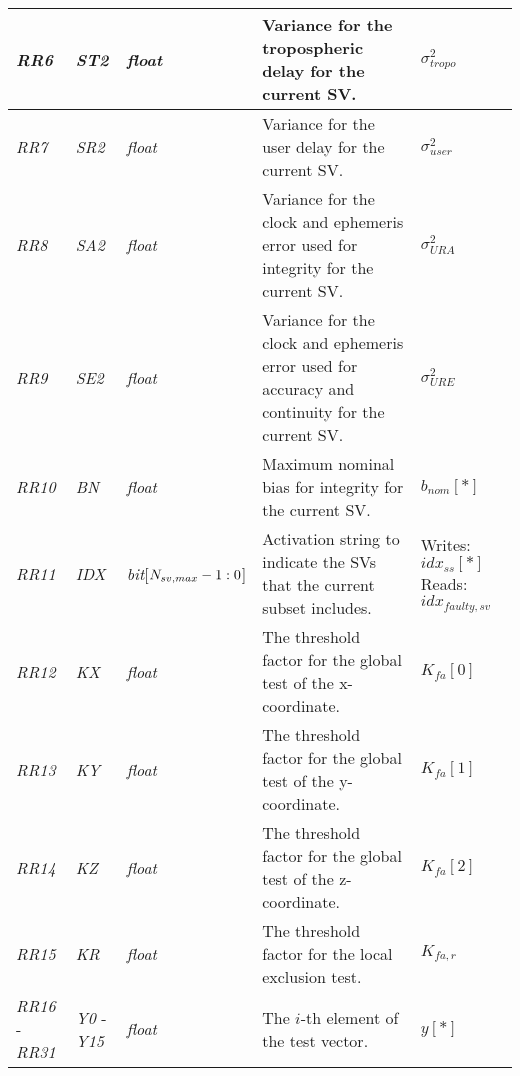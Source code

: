 \documentclass[11pt]{article}
\begin{document}
\begin{table}[htbp]
\begin{center}
\begin{tabular}{|m{1.25cm}|m{1.5cm}|m{1.75cm}|m{5.25cm}|m{1.5cm}|}
    \emph{RR6} & \emph{ST2} & \emph{float} & Variance for the tropospheric delay for the current SV. & $\sigma_{tropo}^2$\\ \hline

    \emph{RR7} & \emph{SR2} & \emph{float} & Variance for the user delay for the current SV. & $\sigma_{user}^2$\\ \hline

    \emph{RR8} & \emph{SA2} & \emph{float} & Variance for the clock and ephemeris error used for integrity for the current SV. & $\sigma_{URA}^2$\\ \hline

    \emph{RR9} & \emph{SE2} & \emph{float} & Variance for the clock and ephemeris error used for accuracy and continuity for the current SV. & $\sigma_{URE}^2$\\ \hline

    \emph{RR10} & \emph{BN} & \emph{float} & Maximum nominal bias for integrity for the current SV. & $b_{nom}[*]$\\ \hline

    \emph{RR11} & \emph{IDX} & \emph{bit}[$N_{sv,max}\newline-1:0$] & Activation string to indicate the SVs that the current subset includes. & Writes: $idx_{ss}[*]$ \newline Reads: $idx_{faulty,sv}$\\ \hline

    \emph{RR12} & \emph{KX} & \emph{float} & The threshold factor for the global test of the x-coordinate. & $K_{fa}[0]$\\ \hline

    \emph{RR13} & \emph{KY} & \emph{float} & The threshold factor for the global test of the y-coordinate. & $K_{fa}[1]$\\ \hline

    \emph{RR14} & \emph{KZ} & \emph{float} & The threshold factor for the global test of the z-coordinate. & $K_{fa}[2]$\\ \hline

    \emph{RR15} & \emph{KR} & \emph{float} & The threshold factor for the local exclusion test. & $K_{fa,r}$\\ \hline

    \emph{RR16} - \emph{RR31} & \emph{Y0} - \emph{Y15} & \emph{float} & The $i$-th element of the test vector. & $y[*]$\\ \hline
  \end{tabular}
\end{center}
\end{table}
\end{document}
